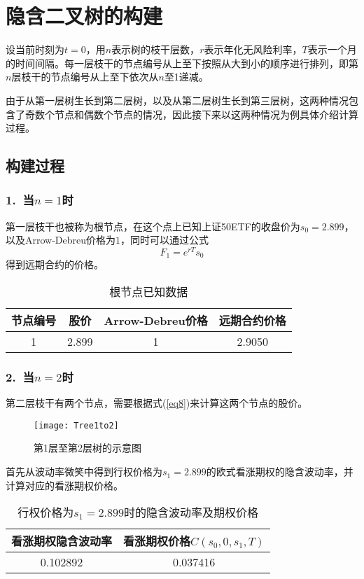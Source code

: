 \section{隐含二叉树的构建}
设当前时刻为$t=0$，用$n$表示树的枝干层数，$r$表示年化无风险利率，$T$表示一个月的时间间隔。每一层枝干的节点编号从上至下按照从大到小的顺序进行排列，即第$n$层枝干的节点编号从上至下依次从$n$至1递减。

由于从第一层树生长到第二层树，以及从第二层树生长到第三层树，这两种情况包含了奇数个节点和偶数个节点的情况，因此接下来以这两种情况为例具体介绍计算过程。

\subsection{构建过程}
\subsubsection{1. $\ $当$n=1$时}
第一层枝干也被称为根节点，在这个点上已知上证50ETF的收盘价为$s_0 = 2.899$，以及Arrow-Debreu价格为$1$，同时可以通过公式$$F_1 = e^{rT}s_0$$得到远期合约的价格。
\begin{table}[H]
	\centering
	\caption{根节点已知数据}
	\begin{tabular}{|c|c|c|c|}
		\hline
		 节点编号&股价&Arrow-Debreu价格&远期合约价格 \\\hline
		1&2.899&1&2.9050 \\\hline
	\end{tabular}
\end{table}

\subsubsection{2. $\ $当$n=2$时}

第二层枝干有两个节点，需要根据式(\ref{eq8})来计算这两个节点的股价。
\begin{figure}[H]
	\centering
	\texttt{[image: Tree1to2]}
	\caption{第1层至第2层树的示意图}
\end{figure}
首先从波动率微笑中得到行权价格为$s_1 = 2.899$的欧式看涨期权的隐含波动率，并计算对应的看涨期权价格。
\begin{table}[H]
	\centering
	\caption{行权价格为$s_1 = 2.899$时的隐含波动率及期权价格}
	\begin{tabular}{|c|c|}
		\hline
		看涨期权隐含波动率 & 看涨期权价格$C(s_0,0,s_1,T)$\\\hline
		0.102892&0.037416\\\hline
	\end{tabular}
\end{table}

